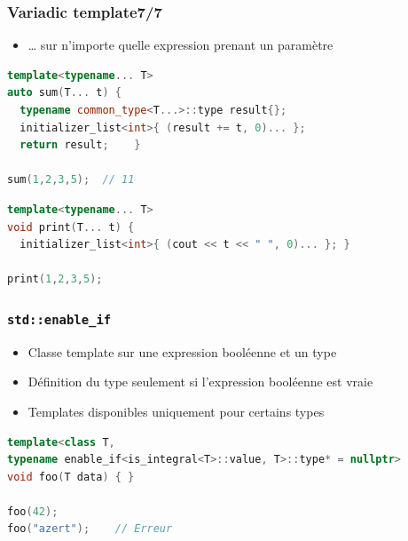 \documentclass[C++.tex]{subfiles}
\begin{document}
\begin{frame}[fragile]
	\frametitle{Variadic template\titlehfill{}7/7}
	\begin{itemize}
		\item \ldots{} sur n'importe quelle expression prenant un paramètre

	\end{itemize}

	\begin{lstlisting}[language=C++]
template<typename... T>
auto sum(T... t) {
  typename common_type<T...>::type result{};
  initializer_list<int>{ (result += t, 0)... };
  return result; 	}

sum(1,2,3,5);  // 11\end{lstlisting}

	\begin{lstlisting}[language=C++]
template<typename... T>
void print(T... t) {
  initializer_list<int>{ (cout << t << " ", 0)... }; }

print(1,2,3,5);\end{lstlisting}
\end{frame}

\begin{frame}[fragile]
	\frametitle{\lstinline|std::enable_if|}
	\begin{itemize}
		\item Classe template sur une expression booléenne et un type
		\item Définition du type seulement si l'expression booléenne est vraie
		\item Templates disponibles uniquement pour certains types
	\end{itemize}

	\begin{lstlisting}[language=C++]
template<class T, 
typename enable_if<is_integral<T>::value, T>::type* = nullptr>
void foo(T data) { }

foo(42);
foo("azert");    // Erreur\end{lstlisting}
\end{frame}
\end{document}
